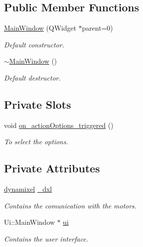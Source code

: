 \subsection*{Public Member Functions}
\begin{DoxyCompactItemize}
\item 
\hyperlink{class_main_window_a8b244be8b7b7db1b08de2a2acb9409db}{Main\+Window} (Q\+Widget $\ast$parent=0)
\begin{DoxyCompactList}\small\item\em Default constructor. \end{DoxyCompactList}\item 
\hyperlink{class_main_window_ae98d00a93bc118200eeef9f9bba1dba7}{$\sim$\+Main\+Window} ()
\begin{DoxyCompactList}\small\item\em Default destructor. \end{DoxyCompactList}\end{DoxyCompactItemize}
\subsection*{Private Slots}
\begin{DoxyCompactItemize}
\item 
void \hyperlink{class_main_window_a1dd57ccb62bc6f5a361aba6e088dd2e1}{on\+\_\+action\+Options\+\_\+triggered} ()
\begin{DoxyCompactList}\small\item\em To select the options. \end{DoxyCompactList}\end{DoxyCompactItemize}
\subsection*{Private Attributes}
\begin{DoxyCompactItemize}
\item 
\hyperlink{classdynamixel}{dynamixel} \hyperlink{class_main_window_a07b4b97f6d4dfa77704b70d7dbbbebee}{\+\_\+dxl}
\begin{DoxyCompactList}\small\item\em Contains the comunication with the motors. \end{DoxyCompactList}\item 
Ui\+::\+Main\+Window $\ast$ \hyperlink{class_main_window_a35466a70ed47252a0191168126a352a5}{ui}
\begin{DoxyCompactList}\small\item\em Contains the user interface. \end{DoxyCompactList}\end{DoxyCompactItemize}


